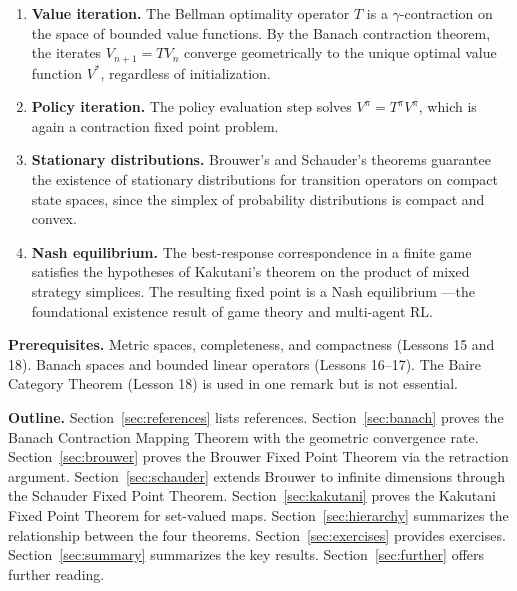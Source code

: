 \documentclass[11pt,a4paper]{article}
\begin{document}
\begin{rlconnection}[title={Fixed Point Theorems in Reinforcement Learning}]
\begin{enumerate}[leftmargin=2em,nosep]
    \item \textbf{Value iteration.}  The Bellman optimality operator
          $T$ is a $\gamma$-contraction on the space of bounded value
          functions.  By the Banach contraction theorem, the iterates
          $V_{n+1} = TV_n$ converge geometrically to the unique
          optimal value function $V^*$, regardless of initialization.
    \item \textbf{Policy iteration.}  The policy evaluation step
          solves $V^\pi = T^\pi V^\pi$, which is again a contraction
          fixed point problem.
    \item \textbf{Stationary distributions.}  Brouwer's and
          Schauder's theorems guarantee the existence of stationary
          distributions for transition operators on compact state
          spaces, since the simplex of probability distributions is
          compact and convex.
    \item \textbf{Nash equilibrium.}  The best-response
          correspondence in a finite game satisfies the hypotheses of
          Kakutani's theorem on the product of mixed strategy
          simplices.  The resulting fixed point is a Nash equilibrium
          ---the foundational existence result of game theory and
          multi-agent RL.
\end{enumerate}
\end{rlconnection}

\medskip
\noindent\textbf{Prerequisites.}  Metric spaces, completeness, and
compactness (Lessons 15 and 18).  Banach spaces and bounded linear
operators (Lessons 16--17).  The Baire Category Theorem (Lesson 18)
is used in one remark but is not essential.

\medskip
\noindent\textbf{Outline.}
Section~\ref{sec:references} lists references.
Section~\ref{sec:banach} proves the Banach Contraction Mapping
Theorem with the geometric convergence rate.
Section~\ref{sec:brouwer} proves the Brouwer Fixed Point Theorem via
the retraction argument.
Section~\ref{sec:schauder} extends Brouwer to infinite dimensions
through the Schauder Fixed Point Theorem.
Section~\ref{sec:kakutani} proves the Kakutani Fixed Point Theorem
for set-valued maps.
Section~\ref{sec:hierarchy} summarizes the relationship between the
four theorems.
Section~\ref{sec:exercises} provides exercises.
Section~\ref{sec:summary} summarizes the key results.
Section~\ref{sec:further} offers further reading.
\end{document}
